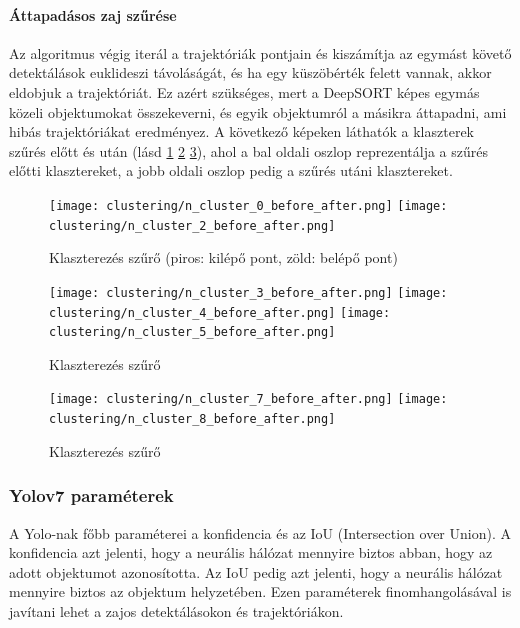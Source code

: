 \documentclass[12pt,a4paper]{article}
\begin{document}
\paragraph{Áttapadásos zaj szűrése} Az algoritmus végig iterál a trajektóriák pontjain és kiszámítja az egymást követő detektálások euklideszi távoláságát, és ha egy küszöbérték felett vannak, akkor eldobjuk a trajektóriát.
Ez azért szükséges, mert a DeepSORT képes egymás közeli objektumokat összekeverni, és egyik objektumról a másikra áttapadni, ami hibás trajektóriákat eredményez.
A következő képeken láthatók a klaszterek szűrés előtt és után (lásd \ref{fig: Klaszterezés szűrő} \ref{fig: Klaszterezés szűrő2} \ref{fig: Klaszterezés szűrő3}), ahol a bal oldali oszlop reprezentálja a szűrés előtti klasztereket, a jobb oldali oszlop pedig a szűrés utáni klasztereket.

\begin{figure}[htbp]
    \centering
    \texttt{[image: clustering/n\_cluster\_0\_before\_after.png]}
    \centering
    \texttt{[image: clustering/n\_cluster\_2\_before\_after.png]}
    \caption{Klaszterezés szűrő (piros: kilépő pont, zöld: belépő pont)}
    \label{fig: Klaszterezés szűrő}
\end{figure}
\begin{figure}[htbp]
    \centering
    \texttt{[image: clustering/n\_cluster\_3\_before\_after.png]}
    \centering
    \texttt{[image: clustering/n\_cluster\_4\_before\_after.png]}
    \centering
    \texttt{[image: clustering/n\_cluster\_5\_before\_after.png]}
    \caption{Klaszterezés szűrő}
    \label{fig: Klaszterezés szűrő2}
\end{figure}
\begin{figure}[htbp]
    \texttt{[image: clustering/n\_cluster\_7\_before\_after.png]}
    \texttt{[image: clustering/n\_cluster\_8\_before\_after.png]}
    \caption{Klaszterezés szűrő}
    \label{fig: Klaszterezés szűrő3}
\end{figure}

\subsubsection{Yolov7 paraméterek}
A Yolo-nak főbb paraméterei a konfidencia és az IoU (Intersection over Union). A konfidencia azt jelenti, hogy a neurális hálózat mennyire biztos abban, hogy az adott objektumot azonosította.
Az IoU pedig azt jelenti, hogy a neurális hálózat mennyire biztos az objektum helyzetében. Ezen paraméterek finomhangolásával is javítani lehet a zajos detektálásokon és trajektóriákon.
\end{document}
